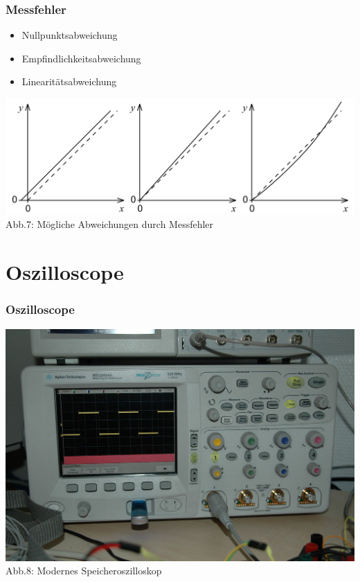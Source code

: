 \begin{frame}
    \frametitle{Messfehler}
    \begin{center}
    		\begin{itemize}
				\item Nullpunktsabweichung
				\item Empfindlichkeitsabweichung
				\item Linearitätsabweichung
    		\end{itemize}
        \includegraphics[width=1\textwidth]{a16/werMisstMisst.png}\\
       	Abb.7: Mögliche Abweichungen durch Messfehler \cite{wmde}
	\end{center}
\end{frame}

\section*{Oszilloscope}

\begin{frame}
    \frametitle{Oszilloscope}
    \begin{center}
        \includegraphics[width=1\textwidth]{a16/osziModern.jpg}\\
        Abb.8: Modernes Speicheroszilloskop \cite{wmde}
	\end{center}
\end{frame}

